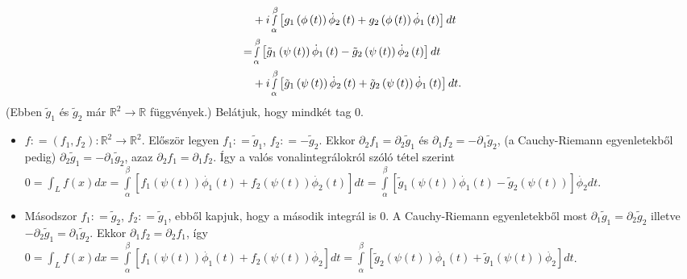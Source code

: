 \documentclass[12pt,a4paper]{scrartcl}
\providecommand{\tightlist}{%
  \setlength{\itemsep}{0pt}\setlength{\parskip}{0pt}}
\newenvironment{bizonyitas}{}{}
\begin{document}
\begin{bizonyitas}
\[\begin{aligned}
   &  + i\mathop \smallint \limits_\alpha ^\beta  \left[ {{g_1}\left( {\phi \left( t \right)} \right){{\dot \phi }_2}\left( t \right) + {g_2}\left( {\phi \left( t \right)} \right){{\dot \phi }_1}\left( t \right)} \right]dt \\ 
   =  & \mathop \smallint \limits_\alpha ^\beta  \left[ {{{\tilde g}_1}\left( {\psi \left( t \right)} \right){{\dot \phi }_1}\left( t \right) - {{\tilde g}_2}\left( {\psi \left( t \right)} \right){{\dot \phi }_2}\left( t \right)} \right]dt \\ 
   &  + i\mathop \smallint \limits_\alpha ^\beta  \left[ {{{\tilde g}_1}\left( {\psi \left( t \right)} \right){{\dot \phi }_2}\left( t \right) + {{\tilde g}_2}\left( {\psi \left( t \right)} \right){{\dot \phi }_1}\left( t \right)} \right]dt. \\ 
\end{aligned} \] (Ebben \({\widetilde{g}}_{1}\) és
\({\widetilde{g}}_{2}\) már
\(\left. {\mathbb{R}}^{2}\rightarrow{\mathbb{R}} \right.\) függvények.)
Belátjuk, hogy mindkét tag 0.

\begin{itemize}
\tightlist
\item
  \(\left. f: = \left( {f_{1},f_{2}} \right):{\mathbb{R}}^{2}\rightarrow{\mathbb{R}}^{2} \right.\).
  Először legyen \(f_{1}: = {\widetilde{g}}_{1}\),
  \(f_{2}: = - {\widetilde{g}}_{2}\). Ekkor
  \(\partial_{2}f_{1} = \partial_{2}{\widetilde{g}}_{1}\) és
  \(\partial_{1}f_{2} = - \partial_{1}{\widetilde{g}}_{2}\), (a
  Cauchy-Riemann egyenletekből pedig)
  \(\partial_{2}{\widetilde{g}}_{1} = - \partial_{1}{\widetilde{g}}_{2}\),
  azaz \(\partial_{2}f_{1} = \partial_{1}f_{2}\). Így a valós
  vonalintegrálokról szóló tétel szerint
  \(0 = {\int_{L}{f\left( x \right)dx}} = {\int\limits_{\alpha}^{\beta}{\left\lbrack {f_{1}\left( {\psi\left( t \right)} \right){\overset{.}{\phi}}_{1}\left( t \right) + f_{2}\left( {\psi\left( t \right)} \right){\overset{.}{\phi}}_{2}\left( t \right)} \right\rbrack dt}} = {\int\limits_{\alpha}^{\beta}{\left\lbrack {{\widetilde{g}}_{1}\left( {\psi\left( t \right)} \right){\overset{.}{\phi}}_{1}\left( t \right) - {\widetilde{g}}_{2}\left( {\psi\left( t \right)} \right)} \right\rbrack{\overset{.}{\phi}}_{2}dt}}\).
\item
  Másodszor \(f_{1}: = {\widetilde{g}}_{2}\),
  \(f_{2}: = {\widetilde{g}}_{1}\), ebből kapjuk, hogy a második
  integrál is 0. A Cauchy-Riemann egyenletekből most
  \(\partial_{1}{\widetilde{g}}_{1} = \partial_{2}{\widetilde{g}}_{2}\)
  illetve
  \(- \partial_{2}{\widetilde{g}}_{1} = \partial_{1}{\widetilde{g}}_{2}\).
  Ekkor \(\partial_{1}f_{2} = \partial_{2}f_{1}\), így
  \(0 = {\int_{L}{f\left( x \right)dx}} = {\int\limits_{\alpha}^{\beta}{\left\lbrack {f_{1}\left( {\psi\left( t \right)} \right){\overset{.}{\phi}}_{1}\left( t \right) + f_{2}\left( {\psi\left( t \right)} \right){\overset{.}{\phi}}_{2}} \right\rbrack dt}} = {\int\limits_{\alpha}^{\beta}{\left\lbrack {{\widetilde{g}}_{2}\left( {\psi\left( t \right)} \right){\overset{.}{\phi}}_{1}\left( t \right) + {\widetilde{g}}_{1}\left( {\psi\left( t \right)} \right){\overset{.}{\phi}}_{2}} \right\rbrack dt}}\).
\end{itemize}


\end{bizonyitas}
\end{document}
